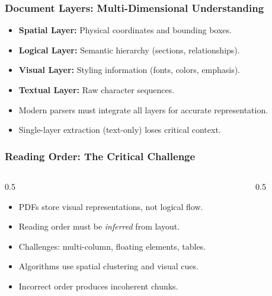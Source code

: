 \begin{frame}[fragile]\frametitle{Document Layers: Multi-Dimensional Understanding}
      \begin{itemize}
        \item \textbf{Spatial Layer:} Physical coordinates and bounding boxes.
        \item \textbf{Logical Layer:} Semantic hierarchy (sections, relationships).
        \item \textbf{Visual Layer:} Styling information (fonts, colors, emphasis).
        \item \textbf{Textual Layer:} Raw character sequences.
        \item Modern parsers must integrate all layers for accurate representation.
        \item Single-layer extraction (text-only) loses critical context.
      \end{itemize}
\end{frame}

\begin{frame}[fragile]\frametitle{Reading Order: The Critical Challenge}
\begin{columns}
    \begin{column}[T]{0.5\linewidth}
      \begin{itemize}
        \item PDFs store visual representations, not logical flow.
        \item Reading order must be \textit{inferred} from layout.
        \item Challenges: multi-column, floating elements, tables.
        \item Algorithms use spatial clustering and visual cues.
        \item Incorrect order produces incoherent chunks.
      \end{itemize}
    \end{column}
    \begin{column}[T]{0.5\linewidth}

    \end{column}
  \end{columns}
\end{frame}

